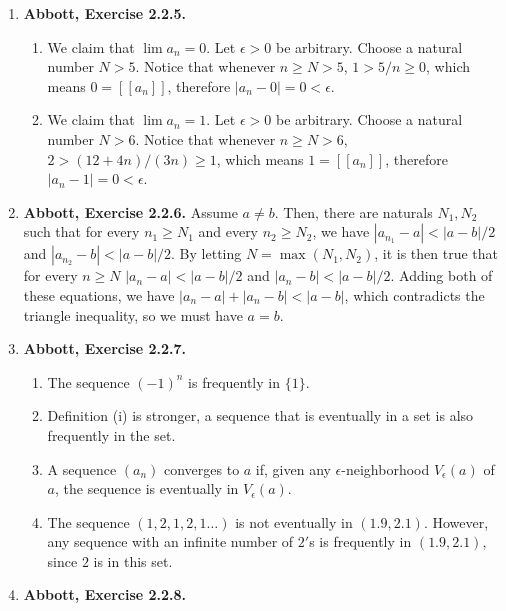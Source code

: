 \documentclass{article}
\newcommand{\exc}[2][Abbott]{\item \textbf{#1, Exercise #2.}}
\let\oldmax\max
\renewcommand{\max}[1]{\oldmax \left( #1 \right)}
\begin{document}
\begin{enumerate}
	\exc{2.2.5}
				      	              
	\begin{enumerate}
		\item We claim that $\lim a_n = 0$. Let $\epsilon > 0$ be arbitrary. Choose a natural number $N > 5$. Notice that whenever $n \geq N > 5$, $1 > 5/n \geq 0$, which means $0 = [[a_n]]$, therefore $|a_n - 0| = 0 < \epsilon$.
		      		      		      	      	      	      	                  
		\item We claim that $\lim a_n = 1$. Let $\epsilon > 0$ be arbitrary. Choose a natural number $N > 6$. Notice that whenever $n \geq N > 6$, $2 > (12+4n)/(3n) \geq 1$, which means $1 = [[a_n]]$, therefore $|a_n - 1| = 0 < \epsilon$.
	\end{enumerate}
				      	              
	\exc{2.2.6}
	Assume $a \neq b$. Then, there are naturals $N_1, N_2$ such that for every $n_1 \geq N_1$ and every $n_2 \geq N_2$, we have $|a_{n_1} - a| < |a-b|/2$ and $|a_{n_2} - b| < |a-b|/2$. By letting $N = \max{N_1, N_2}$, it is then true that for every $n \geq N$ $|a_n - a| < |a-b|/2$ and $|a_n - b| < |a-b|/2$. Adding both of these equations, we have $|a_n - a| + |a_n - b| < |a-b|$, which contradicts the triangle inequality, so we must have $a = b$.
				      	              
	\exc{2.2.7}
				      	              
	\begin{enumerate}
		\item The sequence $(-1)^n$ is frequently in $\{1\}$.
		\item Definition (i) is stronger, a sequence that is eventually in a set is also frequently in the set.
		      		      		      	      	      	      	                  
		\item A sequence $(a_n)$ converges to $a$ if, given any $\epsilon$-neighborhood $V_\epsilon(a)$ of $a$, the sequence is eventually in $V_\epsilon(a)$.
		      		      		      	      	      	      	                  
		\item The sequence $(1,2,1,2,1\dots)$ is not eventually in $(1.9, 2.1)$. However, any sequence with an infinite number of $2'$s is frequently in $(1.9, 2.1)$, since $2$ is in this set. 
	\end{enumerate}
				      	              
	\exc{2.2.8}
				      	              

\end{enumerate}
\end{document}
